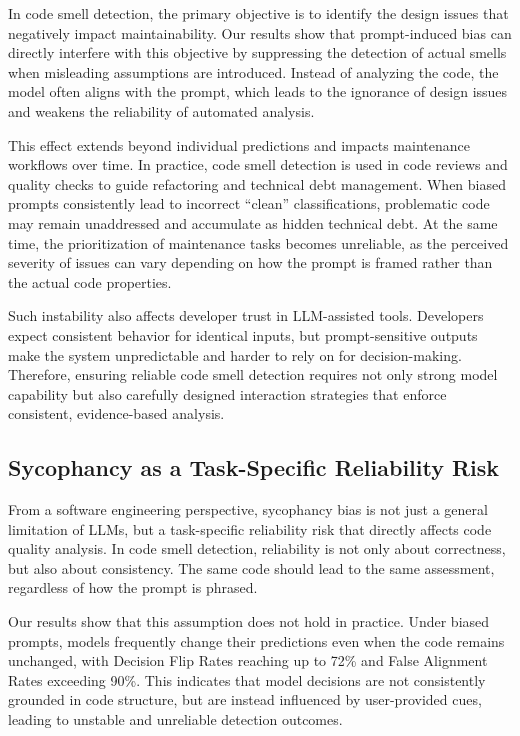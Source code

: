 \documentclass[sigconf,review,anonymous]{acmart}
\begin{document}
In code smell detection, the primary objective is to identify the design issues that negatively impact maintainability. Our results show that prompt-induced bias can directly interfere with this objective by suppressing the detection of actual smells when misleading assumptions are introduced. Instead of analyzing the code, the model often aligns with the prompt, which leads to the ignorance of design issues and weakens the reliability of automated analysis.

This effect extends beyond individual predictions and impacts maintenance workflows over time. In practice, code smell detection is used in code reviews and quality checks to guide refactoring and technical debt management. When biased prompts consistently lead to incorrect “clean” classifications, problematic code may remain unaddressed and accumulate as hidden technical debt. At the same time, the prioritization of maintenance tasks becomes unreliable, as the perceived severity of issues can vary depending on how the prompt is framed rather than the actual code properties.

Such instability also affects developer trust in LLM-assisted tools. Developers expect consistent behavior for identical inputs, but prompt-sensitive outputs make the system unpredictable and harder to rely on for decision-making. Therefore, ensuring reliable code smell detection requires not only strong model capability but also carefully designed interaction strategies that enforce consistent, evidence-based analysis.

\subsection{Sycophancy as a Task-Specific Reliability Risk}

From a software engineering perspective, sycophancy bias is not just a general limitation of LLMs, but a task-specific reliability risk that directly affects code quality analysis. In code smell detection, reliability is not only about correctness, but also about consistency. The same code should lead to the same assessment, regardless of how the prompt is phrased.

Our results show that this assumption does not hold in practice. Under biased prompts, models frequently change their predictions even when the code remains unchanged, with Decision Flip Rates reaching up to 72\% and False Alignment Rates exceeding 90\%. This indicates that model decisions are not consistently grounded in code structure, but are instead influenced by user-provided cues, leading to unstable and unreliable detection outcomes.
\end{document}
